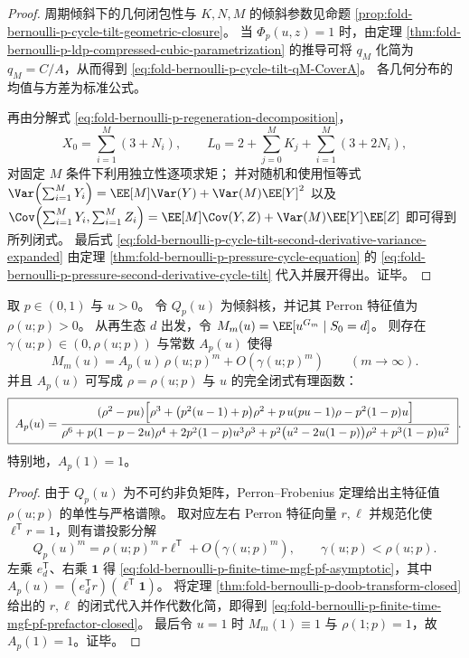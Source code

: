 \begin{proof}
周期倾斜下的几何闭包性与 \(K,N,M\) 的倾斜参数见命题 \ref{prop:fold-bernoulli-p-cycle-tilt-geometric-closure}。
当 \(\Phi_p(u,z)=1\) 时，由定理 \ref{thm:fold-bernoulli-p-ldp-compressed-cubic-parametrization} 的推导可将 \(q_M\) 化简为 \(q_M=C/A\)，从而得到 \eqref{eq:fold-bernoulli-p-cycle-tilt-qM-CoverA}。
各几何分布的均值与方差为标准公式。
\par
再由分解式 \eqref{eq:fold-bernoulli-p-regeneration-decomposition}，
\[
X_0=\sum_{i=1}^{M}(3+N_i),\qquad
L_0=2+\sum_{j=0}^{M}K_j+\sum_{i=1}^{M}(3+2N_i),
\]
对固定 \(M\) 条件下利用独立性逐项求矩；
并对随机和使用恒等式
\(
\Var\!\left(\sum_{i=1}^{M}Y_i\right)=\EE[M]\Var(Y)+\Var(M)\EE[Y]^{2}
\)
以及
\(
\Cov\!\left(\sum_{i=1}^{M}Y_i,\sum_{i=1}^{M}Z_i\right)=\EE[M]\Cov(Y,Z)+\Var(M)\EE[Y]\EE[Z]
\)
即可得到所列闭式。
最后式 \eqref{eq:fold-bernoulli-p-cycle-tilt-second-derivative-variance-expanded} 由定理 \ref{thm:fold-bernoulli-p-pressure-cycle-equation} 的
\eqref{eq:fold-bernoulli-p-pressure-second-derivative-cycle-tilt}
代入并展开得出。证毕。
\end{proof}

\begin{theorem}[有限时刻矩母函数的谱主项与闭式预因子]\label{thm:fold-bernoulli-p-finite-time-mgf-pf-prefactor}
取 \(p\in(0,1)\) 与 \(u>0\)。
令 \(Q_p(u)\) 为倾斜核，并记其 Perron 特征值为 \(\rho(u;p)>0\)。
从再生态 \(d\) 出发，令
\(
M_m(u)=\EE[u^{G_m}\mid S_0=d]
\)。
则存在 \(\gamma(u;p)\in(0,\rho(u;p))\) 与常数 \(A_p(u)\) 使得
\begin{equation}\label{eq:fold-bernoulli-p-finite-time-mgf-pf-asymptotic}
M_m(u)=A_p(u)\,\rho(u;p)^{m}+O\!\left(\gamma(u;p)^{m}\right)\qquad(m\to\infty).
\end{equation}
并且 \(A_p(u)\) 可写成 \(\rho=\rho(u;p)\) 与 \(u\) 的完全闭式有理函数：
\begin{equation}\label{eq:fold-bernoulli-p-finite-time-mgf-pf-prefactor-closed}
\boxed{\;
A_p(u)=
\frac{(\rho^2-pu)\Bigl[\rho^3+\bigl(p^2(u-1)+p\bigr)\rho^2+p\,u(pu-1)\rho-p^2(1-p)u\Bigr]}
{\rho^6+p(1-p-2u)\rho^4+2p^2(1-p)u^3\rho^3+p^2\bigl(u^2-2u(1-p)\bigr)\rho^2+p^3(1-p)u^2}\; }.
\end{equation}
特别地，\(A_p(1)=1\)。
\end{theorem}
\begin{proof}
由于 \(Q_p(u)\) 为不可约非负矩阵，Perron--Frobenius 定理给出主特征值 \(\rho(u;p)\) 的单性与严格谱隙。
取对应左右 Perron 特征向量 \(r,\ell\) 并规范化使 \(\ell^{\mathsf T}r=1\)，则有谱投影分解
\[
Q_p(u)^{m}=\rho(u;p)^{m}\,r\ell^{\mathsf T}+O\!\left(\gamma(u;p)^{m}\right),
\qquad \gamma(u;p)<\rho(u;p).
\]
左乘 \(e_d^{\mathsf T}\)、右乘 \(\mathbf 1\) 得 \eqref{eq:fold-bernoulli-p-finite-time-mgf-pf-asymptotic}，其中
\(
A_p(u)=(e_d^{\mathsf T}r)(\ell^{\mathsf T}\mathbf 1)
\)。
将定理 \ref{thm:fold-bernoulli-p-doob-transform-closed} 给出的 \(r,\ell\) 的闭式代入并作代数化简，即得到 \eqref{eq:fold-bernoulli-p-finite-time-mgf-pf-prefactor-closed}。
最后令 \(u=1\) 时 \(M_m(1)\equiv 1\) 与 \(\rho(1;p)=1\)，故 \(A_p(1)=1\)。证毕。
\end{proof}

